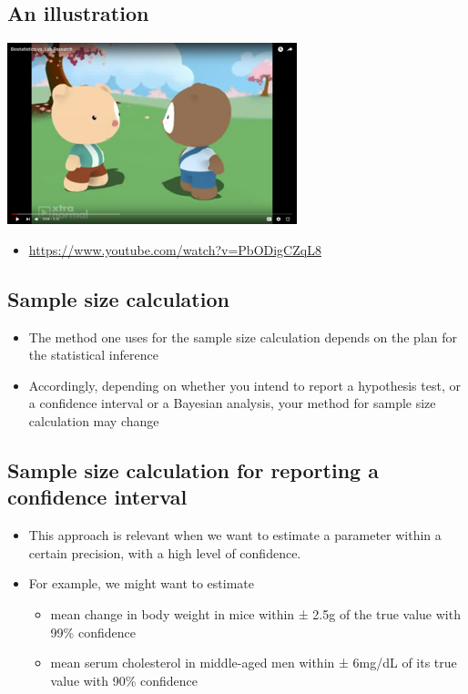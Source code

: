 \documentclass[
]{book}
\providecommand{\tightlist}{%
  \setlength{\itemsep}{0pt}\setlength{\parskip}{0pt}}
\begin{document}
\hypertarget{an-illustration}{%
\subsection{An illustration}\label{an-illustration}}

\includegraphics[width=0.5\linewidth]{./3_66}

\begin{itemize}
\tightlist
\item
  \url{https://www.youtube.com/watch?v=PbODigCZqL8}
\end{itemize}

\hypertarget{sample-size-calculation}{%
\subsection{Sample size calculation}\label{sample-size-calculation}}

\begin{itemize}
\tightlist
\item
  The method one uses for the sample size calculation depends on the plan for the statistical inference
\item
  Accordingly, depending on whether you intend to report a hypothesis test, or a confidence interval or a Bayesian analysis, your method for sample size calculation may change
\end{itemize}

\hypertarget{sample-size-calculation-for-reporting-a-confidence-interval}{%
\subsection{Sample size calculation for reporting a confidence interval}\label{sample-size-calculation-for-reporting-a-confidence-interval}}

\begin{itemize}
\tightlist
\item
  This approach is relevant when we want to estimate a parameter within a certain precision, with a high level of confidence.
\item
  For example, we might want to estimate

  \begin{itemize}
  \tightlist
  \item
    mean change in body weight in mice within ± 2.5g of the true value with 99\% confidence
  \item
    mean serum cholesterol in middle-aged men within ± 6mg/dL of its true value with 90\% confidence
  \end{itemize}
\end{itemize}
\end{document}
